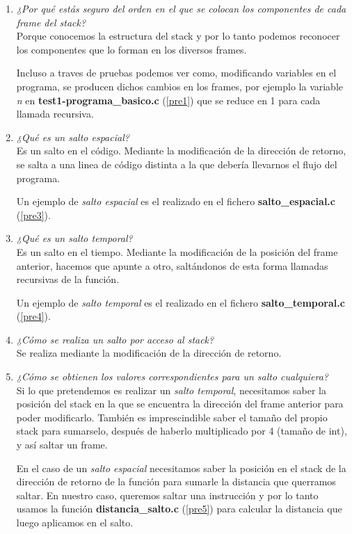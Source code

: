 \documentclass[12pt,a4paper,titlepage]{article}
\begin{document}
\begin{enumerate}
  \item \textit{¿Por qué estás seguro del orden en el que se colocan los componentes
de cada frame del stack?}
  \\
  Porque conocemos la estructura del stack y por lo tanto podemos reconocer los
componentes que lo forman en los diversos frames.

Incluso a traves de pruebas podemos ver como, modificando variables en el programa, se
producen dichos cambios en los frames, por ejemplo la variable \emph{n}
en \textbf{test1-programa\_basico.c} (\ref{pre1}) que se reduce en 1 para cada llamada
recursiva.

  
  \item \textit{¿Qué es un salto espacial?}
  \\
Es un salto en el código. Mediante la modificación de la dirección de retorno, se salta a
una linea de código distinta a la que debería llevarnos el flujo del programa.

Un ejemplo de \emph{salto espacial} es el realizado en el
fichero \textbf{salto\_espacial.c} (\ref{pre3}).
  
  
  \item \textit{¿Qué es un salto temporal?}
  \\
Es un salto en el tiempo. Mediante la modificación de la posición del frame anterior,
hacemos que apunte a otro, saltándonos de esta forma llamadas recursivas de la
función.

Un ejemplo de \emph{salto temporal} es el realizado en el fichero
\textbf{salto\_temporal.c} (\ref{pre4}).


  \item \textit{¿Cómo se realiza un salto por acceso al stack?}
  \\
Se realiza mediante la modificación de la dirección de retorno.
  
  
  \item \textit{¿Cómo se obtienen los valores correspondientes para un salto
cualquiera?}
  \\
Si lo que pretendemos es realizar un \emph{salto temporal}, necesitamos saber la posición
del stack en la que se encuentra la dirección del frame anterior para poder modificarlo.
También es imprescindible saber el tamaño del propio stack para sumarselo, después de
haberlo multiplicado por 4 (tamaño de int), y así saltar un frame.

En el caso de un \emph{salto espacial} necesitamos saber la posición en el stack de la
dirección de retorno de la función para sumarle la distancia que querramos saltar. 
En nuestro caso, queremos saltar una instrucción y por lo tanto usamos la
función \textbf{distancia\_salto.c} (\ref{pre5}) para calcular la distancia que luego
aplicamos en el salto.


\end{enumerate}
\end{document}
